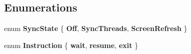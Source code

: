 \subsection*{Enumerations}
\begin{DoxyCompactItemize}
\item 
\mbox{\label{namespace_pillar3_d_a4a4ed1dde606b890812ff619626301ad}} 
enum {\bfseries Sync\+State} \{ {\bfseries Off}, 
{\bfseries Sync\+Threads}, 
{\bfseries Screen\+Refresh}
 \}
\item 
\mbox{\label{namespace_pillar3_d_a5d1a35652f19fae4486e397a9a22e146}} 
enum {\bfseries Instruction} \{ {\bfseries wait}, 
{\bfseries resume}, 
{\bfseries exit}
 \}
\end{DoxyCompactItemize}
